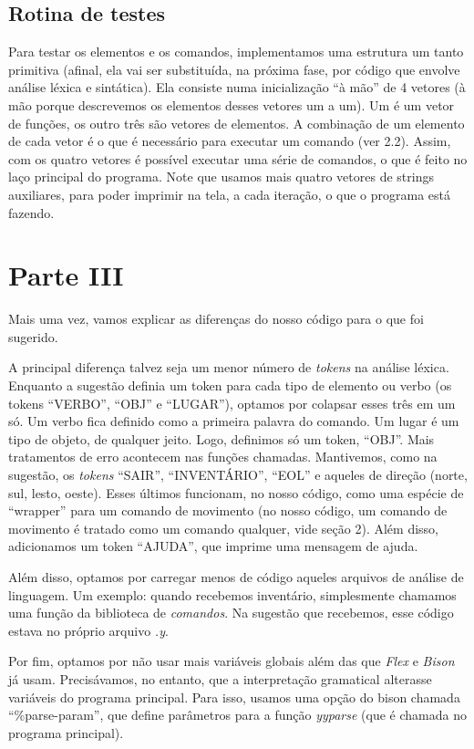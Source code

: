 \documentclass{article}
\begin{document}
\subsection{Rotina de testes}

Para testar os elementos e os comandos, implementamos uma estrutura um tanto
primitiva (afinal, ela vai ser substituída, na próxima fase, por código que
envolve análise léxica e sintática). Ela consiste numa inicialização ``à mão''
de 4 vetores (à mão porque descrevemos os elementos desses vetores um a um). Um
é um vetor de funções, os outro três são vetores de elementos. A combinação de
um elemento de cada vetor é o que é necessário para executar um comando (ver
2.2). Assim, com os quatro vetores é possível executar uma série de
comandos, o que é feito no laço principal do programa. Note que usamos mais
quatro vetores de strings auxiliares, para poder imprimir na tela, a cada
iteração, o que o programa está fazendo.

\section{Parte III}

Mais uma vez, vamos explicar as diferenças do nosso código para o que foi
sugerido.

A principal diferença talvez seja um menor número de \emph{tokens} na análise léxica.
Enquanto a sugestão definia um token para cada tipo de elemento ou verbo (os
tokens ``VERBO'', ``OBJ'' e ``LUGAR''), optamos por colapsar esses três em um
só. Um verbo fica definido como a primeira palavra do comando. Um lugar é um
tipo de objeto, de qualquer jeito. Logo, definimos só um token, ``OBJ''. Mais
tratamentos de erro acontecem nas funções chamadas. Mantivemos, como na
sugestão, os\emph{ tokens} ``SAIR'', ``INVENTÁRIO'', ``EOL'' e aqueles de
direção (norte, sul, lesto, oeste). Esses últimos funcionam, no nosso código,
como uma espécie de ``wrapper'' para um comando de movimento (no nosso código,
um comando de movimento é tratado como um comando qualquer, vide seção 2). Além
disso, adicionamos um token ``AJUDA'', que imprime uma mensagem de ajuda.

Além disso, optamos por carregar menos de código aqueles arquivos de análise de
linguagem. Um exemplo: quando recebemos inventário, simplesmente chamamos uma
função da biblioteca de \emph{comandos}. Na sugestão que recebemos, esse código
estava no próprio arquivo \emph{.y}.

Por fim, optamos por não usar mais variáveis globais além das que \emph{Flex} e
\emph{Bison} já usam. Precisávamos, no entanto, que a interpretação gramatical
alterasse variáveis do programa principal. Para isso, usamos uma
opção do bison chamada ``\%parse-param'', que define parâmetros para a
função\emph{ yyparse} (que é chamada no programa principal).  
\end{document}
